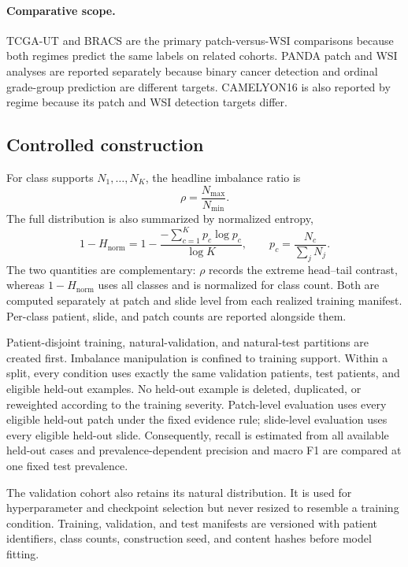 \documentclass[11pt]{article}
\newcommand{\Hnorm}{1-H_{\mathrm{norm}}}
\begin{document}
\paragraph{Comparative scope.}
TCGA-UT and BRACS are the primary patch-versus-WSI comparisons because both regimes predict the same labels on related cohorts. PANDA patch and WSI analyses are reported separately because binary cancer detection and ordinal grade-group prediction are different targets. CAMELYON16 is also reported by regime because its patch and WSI detection targets differ.

\subsection{Controlled construction}
For class supports $N_1,\ldots,N_K$, the headline imbalance ratio is
\begin{equation}
  \rho=\frac{N_{\max}}{N_{\min}}.
  \label{eq:rho}
\end{equation}
The full distribution is also summarized by normalized entropy,
\begin{equation}
  \Hnorm=1-\frac{-\sum_{c=1}^{K}p_c\log p_c}{\log K},
  \qquad p_c=\frac{N_c}{\sum_jN_j}.
  \label{eq:entropy}
\end{equation}
\noindent The two quantities are complementary: $\rho$ records the extreme head--tail contrast, whereas $\Hnorm$ uses all classes and is normalized for class count. Both are computed separately at patch and slide level from each realized training manifest. Per-class patient, slide, and patch counts are reported alongside them.

Patient-disjoint training, natural-validation, and natural-test partitions are created first. Imbalance manipulation is confined to training support. Within a split, every condition uses exactly the same validation patients, test patients, and eligible held-out examples. No held-out example is deleted, duplicated, or reweighted according to the training severity. Patch-level evaluation uses every eligible held-out patch under the fixed evidence rule; slide-level evaluation uses every eligible held-out slide. Consequently, recall is estimated from all available held-out cases and prevalence-dependent precision and macro F1 are compared at one fixed test prevalence.

The validation cohort also retains its natural distribution. It is used for hyperparameter and checkpoint selection but never resized to resemble a training condition. Training, validation, and test manifests are versioned with patient identifiers, class counts, construction seed, and content hashes before model fitting.
\end{document}
